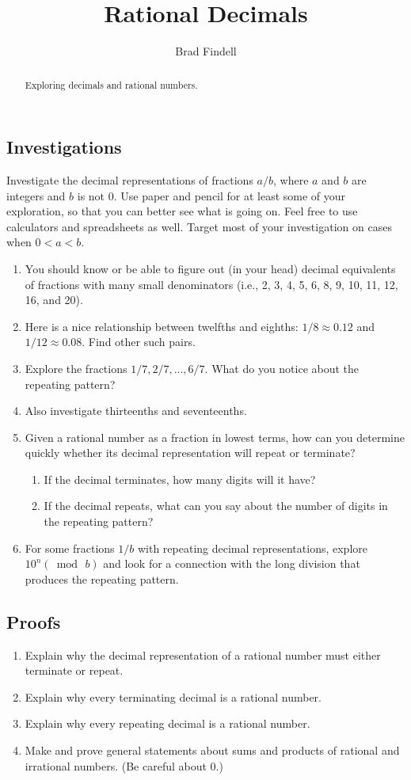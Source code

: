 \documentclass[space,nooutcomes]{ximera}
\title{Rational Decimals}
\author{Brad Findell}
\begin{document}
\begin{abstract}
Exploring decimals and rational numbers.  
\end{abstract}
\maketitle



\subsection*{Investigations}
Investigate the decimal representations of fractions $a/b$, where $a$ and $b$ are integers and $b$ is not $0$.  Use paper and pencil for at least some of your exploration, so that you can better see what is going on.  Feel free to use calculators and spreadsheets as well.  Target most of your investigation on cases when $0 < a < b$.
\begin{enumerate}
\item You should know or be able to figure out (in your head) decimal equivalents of fractions with many small denominators (i.e., 2, 3, 4, 5, 6, 8, 9, 10, 11, 12, 16, and 20).  
\item Here is a nice relationship between twelfths and eighths:  $1/8\approx 0.12$ and $1/12\approx 0.08$.  Find other such pairs.
\item Explore the fractions $1/7, 2/7, \dots, 6/7$.  What do you notice about the repeating pattern?  
\item Also investigate thirteenths and seventeenths.  
\item Given a rational number as a fraction in lowest terms, how can you determine quickly whether its decimal representation will repeat or terminate?
\begin{enumerate}
\item If the decimal terminates, how many digits will it have?  
\item If the decimal repeats, what can you say about the number of digits in the repeating pattern?  
\end{enumerate}
\item For some fractions $1/b$ with repeating decimal representations, explore $10^n (\bmod\, b)$ and look for a connection with the long division that produces the repeating pattern.  
\end{enumerate}

\subsection*{Proofs}
\begin{enumerate}
\item Explain why the decimal representation of a rational number must either terminate or repeat.  
\item Explain why every terminating decimal is a rational number.  
\item Explain why every repeating decimal is a rational number.  
\item Make and prove general statements about sums and products of rational and irrational numbers. (Be careful about 0.) 
\end{enumerate}
\end{document}
